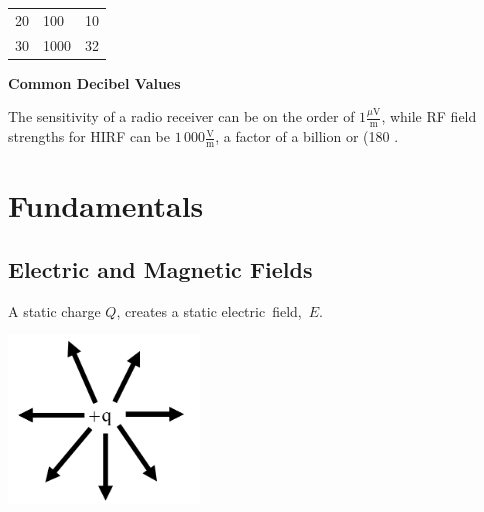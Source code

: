 \documentclass[
]{book}
\begin{document}
\begin{longtable}[]{@{}lll@{}}
\begin{minipage}[t]{0.11\columnwidth}\raggedright
20\strut
\end{minipage} & \begin{minipage}[t]{0.14\columnwidth}\raggedright
100\strut
\end{minipage} & \begin{minipage}[t]{0.15\columnwidth}\raggedright
10\strut
\end{minipage}\tabularnewline
\begin{minipage}[t]{0.11\columnwidth}\raggedright
30\strut
\end{minipage} & \begin{minipage}[t]{0.14\columnwidth}\raggedright
1000\strut
\end{minipage} & \begin{minipage}[t]{0.15\columnwidth}\raggedright
32\strut
\end{minipage}\tabularnewline
\bottomrule
\end{longtable}

\textbf{Common Decibel Values}

The sensitivity of a radio receiver can be on the order of
\(1 \frac{\mu \text{V}}{\text{m}}\), while RF field strengths for
HIRF can be \(1\,000 \frac{\text{V}}{\text{m}}\), a factor of a
billion or (180 .

\hypertarget{fundamentals}{%
\section{Fundamentals}\label{fundamentals}}

\hypertarget{electric-and-magnetic-fields}{%
\subsection{Electric and Magnetic Fields}\label{electric-and-magnetic-fields}}

A static charge \(Q\), creates a static electric~field,~\(E\).

\includegraphics[width=2in,height=\textheight]{media/14/charge-field.png}
\end{document}
